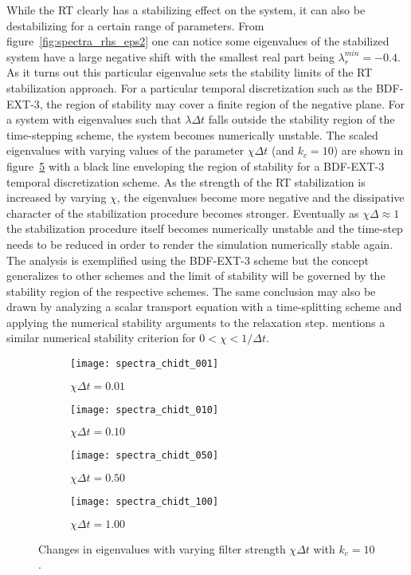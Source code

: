 While the RT clearly has a stabilizing effect on the system, it can also be destabilizing for a certain range of parameters. From figure~\ref{fig:spectra_rhs_eps2} one can notice some eigenvalues of the stabilized system have a large negative shift with the smallest real part being $\lambda_{r}^{min}=-0.4$. As it turns out this particular eigenvalue sets the stability limits of the RT stabilization approach. For a particular temporal discretization such as the BDF-EXT-3, the region of stability may cover a finite region of the negative plane. For a system with eigenvalues such that $\lambda\Delta t$ falls outside the stability region of the time-stepping scheme, the system becomes numerically unstable. The scaled eigenvalues with varying values of the parameter $\chi\Delta t$ (and $k_{c}=10$) are shown in figure~\ref{fig:rt_stability} with a black line enveloping the region of stability for a BDF-EXT-3 temporal discretization scheme. As the strength of the RT stabilization is increased by varying $\chi$, the eigenvalues become more negative and the dissipative character of the stabilization procedure becomes stronger. Eventually as $\chi\Delta \approx 1$ the stabilization procedure itself becomes numerically unstable and the time-step needs to be reduced in order to render the simulation numerically stable again. The analysis is exemplified using the BDF-EXT-3 scheme but the concept generalizes to other schemes and the limit of stability will be governed by the stability region of the respective schemes. The same conclusion may also be drawn by analyzing a scalar transport equation with a time-splitting scheme and applying the numerical stability arguments to the relaxation step. \cite{schlatterphd} mentions a similar numerical stability criterion for $0<\chi<1/\Delta t$.
\begin{figure}[h]
	\centering
	\begin{subfigure}[b]{0.49\textwidth}
		\centering
		\caption{$\chi\Delta t=0.01$}		
		\texttt{[image: spectra\_chidt\_001]}
		\label{fig:spectra_chidt001}
	\end{subfigure}
	\begin{subfigure}[b]{0.49\textwidth}
		\centering
		\caption{$\chi\Delta t=0.10$}		
		\texttt{[image: spectra\_chidt\_010]}
		\label{fig:spectra_chidt01}
	\end{subfigure}
	\begin{subfigure}[b]{0.49\textwidth}
		\centering
		\caption{$\chi\Delta t=0.50$}		
		\texttt{[image: spectra\_chidt\_050]}
		\label{fig:spectra_chidt050}
	\end{subfigure}
	\begin{subfigure}[b]{0.49\textwidth}
		\centering
		\caption{$\chi\Delta t=1.00$}		
		\texttt{[image: spectra\_chidt\_100]}
		\label{fig:spectra_chidt100}
	\end{subfigure}	
	\caption{Changes in eigenvalues with varying filter strength $\chi\Delta t$ with $k_{c}=10$.}
	\label{fig:rt_stability}
\end{figure}
